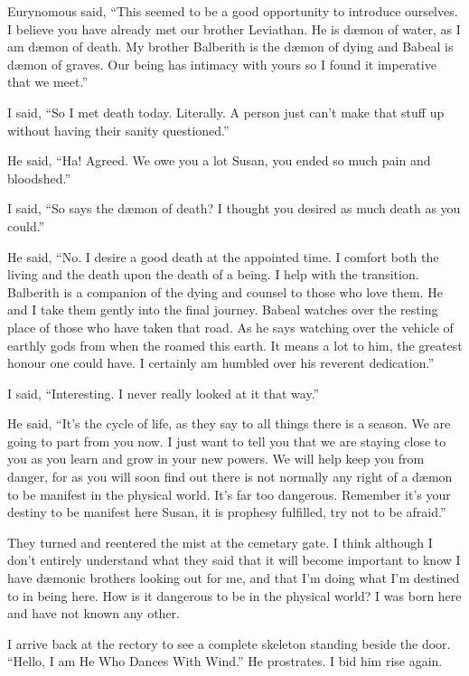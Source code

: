 Eurynomous said, ``This seemed to be a good opportunity to introduce ourselves. I believe you have already met our brother Leviathan. He is d\ae mon of water, as I am d\ae mon of death. My brother Balberith is the d\ae mon of dying and Babeal is d\ae mon of graves. Our being has intimacy with yours so I found it imperative that we meet.''

I said, ``So I met death today. Literally. A person just can't make that stuff up without having their sanity questioned.''

He said, ``Ha! Agreed. We owe you a lot Susan, you ended so much pain and bloodshed.''

I said, ``So says the d\ae mon of death? I thought you desired as much death as you could.''

He said, ``No. I desire a good death at the appointed time. I comfort both the living and the death upon the death of a being. I help with the transition. Balberith is a companion of the dying and counsel to those who love them. He and I take them gently into the final journey. Babeal watches over the resting place of those who have taken that road. As he says watching over the vehicle of earthly gods from when the roamed this earth. It means a lot to him, the greatest honour one could have. I certainly am humbled over his reverent dedication.''

I said, ``Interesting. I never really looked at it that way.''

He said, ``It's the cycle of life, as they say to all things there is a season. We are going to part from you now. I just want to tell you that we are staying close to you as you learn and grow in your new powers. We will help keep you from danger, for as you will soon find out there is not normally any right of a d\ae mon to be manifest in the physical world. It's far too dangerous. Remember it's your destiny to be manifest here Susan, it is prophesy fulfilled, try not to be afraid.''

They turned and reentered the mist at the cemetary gate. I think although I don't entirely understand what they said that it will become important to know I have d\ae monic brothers looking out for me, and that I'm doing what I'm destined to in being here. How is it dangerous to be in the physical world? I was born here and have not known any other.

I arrive back at the rectory to see a complete skeleton standing beside the door. ``Hello, I am He Who Dances With Wind.'' He prostrates. I bid him rise again. 

